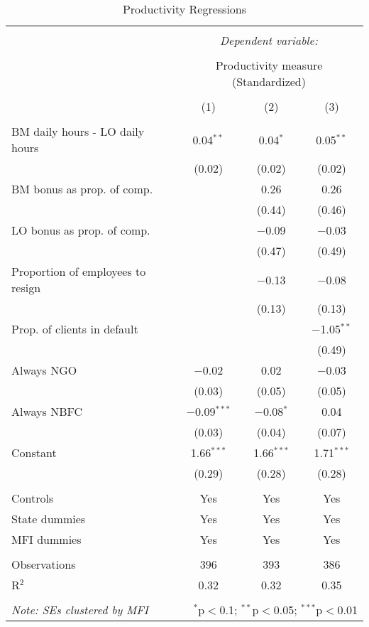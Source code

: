 \documentclass[11pt]{article}
\begin{document}
\begin{table}[!htbp] \centering 
  \caption{Productivity Regressions} 
  \label{} 
\footnotesize 
\begin{tabular}{@{\extracolsep{5pt}}lccc} 
\\[-1.8ex]\hline 
\hline \\[-1.8ex] 
 & \multicolumn{3}{c}{\textit{Dependent variable:}} \\ 
\cline{2-4} 
\\[-1.8ex] & \multicolumn{3}{c}{Productivity measure (Standardized)} \\ 
\\[-1.8ex] & (1) & (2) & (3)\\ 
\hline \\[-1.8ex] 
 BM daily hours - LO daily hours & 0.04$^{**}$ & 0.04$^{*}$ & 0.05$^{**}$ \\ 
  & (0.02) & (0.02) & (0.02) \\ 
  BM bonus as prop. of comp. &  & 0.26 & 0.26 \\ 
  &  & (0.44) & (0.46) \\ 
  LO bonus as prop. of comp. &  & $-$0.09 & $-$0.03 \\ 
  &  & (0.47) & (0.49) \\ 
  Proportion of employees to resign &  & $-$0.13 & $-$0.08 \\ 
  &  & (0.13) & (0.13) \\ 
  Prop. of clients in default &  &  & $-$1.05$^{**}$ \\ 
  &  &  & (0.49) \\ 
  Always NGO & $-$0.02 & 0.02 & $-$0.03 \\ 
  & (0.03) & (0.05) & (0.05) \\ 
  Always NBFC & $-$0.09$^{***}$ & $-$0.08$^{*}$ & 0.04 \\ 
  & (0.03) & (0.04) & (0.07) \\ 
  Constant & 1.66$^{***}$ & 1.66$^{***}$ & 1.71$^{***}$ \\ 
  & (0.29) & (0.28) & (0.28) \\ 
 \hline \\[-1.8ex] 
Controls & Yes & Yes & Yes \\ 
State dummies & Yes & Yes & Yes \\ 
MFI dummies & Yes & Yes & Yes \\ 
\hline \\[-1.8ex] 
Observations & 396 & 393 & 386 \\ 
R$^{2}$ & 0.32 & 0.32 & 0.35 \\ 
\hline 
\hline \\[-1.8ex] 
\textit{Note: SEs clustered by MFI}  & \multicolumn{3}{r}{$^{*}$p$<$0.1; $^{**}$p$<$0.05; $^{***}$p$<$0.01} \\ 
\end{tabular} 
\end{table} 
\end{document}
